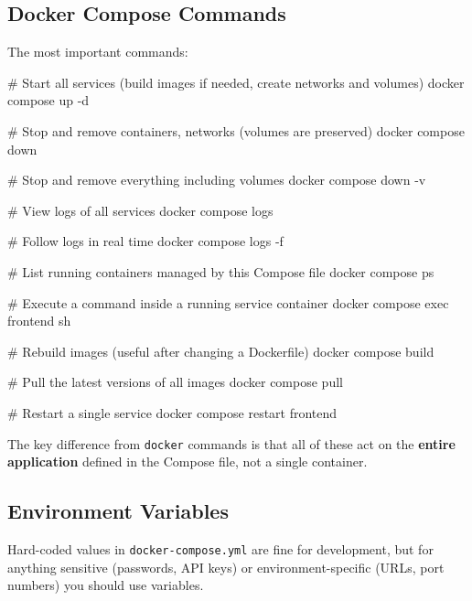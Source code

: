 \documentclass[11pt,american,a4paper,openany]{book}
\newenvironment{Shaded}{}{}
\newcommand{\NormalTok}[1]{#1}
\begin{document}
\subsection{Docker Compose Commands}\label{docker-compose-commands}

The most important commands:

\begin{Shaded}
\begin{Highlighting}[]
\NormalTok{\# Start all services (build images if needed, create networks and volumes)}
\NormalTok{docker compose up {-}d}

\NormalTok{\# Stop and remove containers, networks (volumes are preserved)}
\NormalTok{docker compose down}

\NormalTok{\# Stop and remove everything including volumes}
\NormalTok{docker compose down {-}v}

\NormalTok{\# View logs of all services}
\NormalTok{docker compose logs}

\NormalTok{\# Follow logs in real time}
\NormalTok{docker compose logs {-}f}

\NormalTok{\# List running containers managed by this Compose file}
\NormalTok{docker compose ps}

\NormalTok{\# Execute a command inside a running service container}
\NormalTok{docker compose exec frontend sh}

\NormalTok{\# Rebuild images (useful after changing a Dockerfile)}
\NormalTok{docker compose build}

\NormalTok{\# Pull the latest versions of all images}
\NormalTok{docker compose pull}

\NormalTok{\# Restart a single service}
\NormalTok{docker compose restart frontend}
\end{Highlighting}
\end{Shaded}

The key difference from \texttt{docker} commands is that all of these
act on the \textbf{entire application} defined in the Compose file, not
a single container.

\subsection{Environment Variables}\label{environment-variables}

Hard-coded values in \texttt{docker-compose.yml} are fine for
development, but for anything sensitive (passwords, API keys) or
environment-specific (URLs, port numbers) you should use variables.
\end{document}
